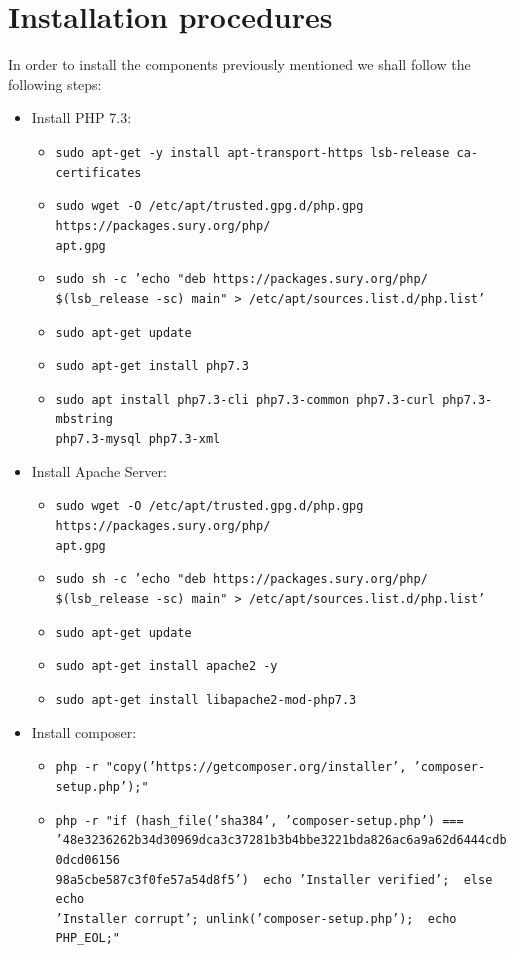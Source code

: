 \section{Installation procedures}
In order to install the components previously mentioned we shall follow the following steps:
\begin{itemize}
	\item Install PHP 7.3:
	\begin{itemize}
		\item \texttt{sudo apt-get -y install apt-transport-https lsb-release ca-certificates}
		\item \texttt{sudo wget -O /etc/apt/trusted.gpg.d/php.gpg https://packages.sury.org/php/\\apt.gpg}
		\item \texttt{sudo sh -c 'echo "deb https://packages.sury.org/php/ \$(lsb\_release -sc) main" > /etc/apt/sources.list.d/php.list'}
		\item \texttt{sudo apt-get update}
		\item \texttt{sudo apt-get install php7.3}
		\item \texttt{sudo apt install php7.3-cli php7.3-common php7.3-curl php7.3-mbstring \\php7.3-mysql php7.3-xml}
	\end{itemize}
	\item Install Apache Server:
	\begin{itemize}
		\item \texttt{sudo wget -O /etc/apt/trusted.gpg.d/php.gpg https://packages.sury.org/php/\\apt.gpg}
		\item \texttt{sudo sh -c 'echo "deb https://packages.sury.org/php/ \$(lsb\_release -sc) main" > /etc/apt/sources.list.d/php.list'}
		\item \texttt{sudo apt-get update}
		\item \texttt{sudo apt-get install apache2 -y}
		\item \texttt{sudo apt-get install libapache2-mod-php7.3}
	\end{itemize}
	\item Install composer:
	\begin{itemize}
		\item \texttt{php -r "copy('https://getcomposer.org/installer', 'composer-setup.php');"}
		\item \texttt{php -r "if (hash\_file('sha384', 'composer-setup.php') ===\\ '48e3236262b34d30969dca3c37281b3b4bbe3221bda826ac6a9a62d6444cdb0dcd06156\\98a5cbe587c3f0fe57a54d8f5') { echo 'Installer verified'; } else { echo\\ 'Installer corrupt'; unlink('composer-setup.php'); } echo PHP\_EOL;"}

\end{itemize}
\end{itemize}
